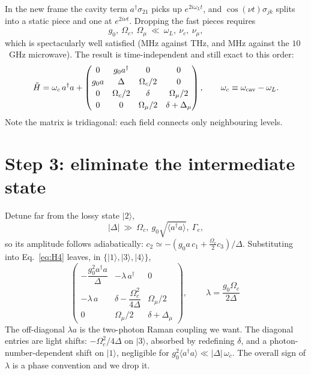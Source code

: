 \documentclass[11pt,a4paper]{article}
\newcommand{\ket}[1]{\lvert #1 \rangle}
\newcommand{\dg}{^{\dagger}}
\newcommand{\Om}{\Omega}
\newcommand{\Omu}{\Omega_{\mu}}
\newcommand{\Dmu}{\Delta_{\mu}}
\begin{document}
In the new frame the cavity term $a\dg\sigma_{21}$ picks up $e^{2i\omega_L t}$, and
$\cos(\nu t)\sigma_{jk}$ splits into a static piece and one at $e^{2i\nu t}$. Dropping the
fast pieces requires
\begin{equation}
  g_0,\ \Om_c,\ \Omu \ \ll\ \omega_L,\ \nu_c,\ \nu_\mu ,
  \tag{A1}
\end{equation}
which is spectacularly well satisfied (MHz against THz, and MHz against the $10$~GHz microwave).
The result is time-independent and still exact to this order:
\begin{equation}
  \tilde H = \omega_c\, a\dg a +
  \begin{pmatrix}
    0        & g_0 a\dg & 0        & 0 \\[2pt]
    g_0 a    & \Delta   & \Om_c/2  & 0 \\[2pt]
    0        & \Om_c/2  & \delta   & \Omu/2 \\[2pt]
    0        & 0        & \Omu/2   & \delta+\Dmu
  \end{pmatrix},
  \qquad \omega_c \equiv \omega_{\rm cav}-\omega_L .
  \label{eq:H4}
\end{equation}
Note the matrix is tridiagonal: each field connects only neighbouring levels.

\section{Step 3: eliminate the intermediate state}

Detune far from the lossy state $\ket{2}$,
\begin{equation}
  |\Delta| \ \gg\ \Om_c,\ g_0\sqrt{\langle a\dg a\rangle},\ \Gamma_e ,
  \tag{A2}
\end{equation}
so its amplitude follows adiabatically: $c_2 \simeq -(g_0 a\,c_1 + \tfrac{\Om_c}{2}c_3)/\Delta$.
Substituting into Eq.~\eqref{eq:H4} leaves, in $\{\ket{1},\ket{3},\ket{4}\}$,
\begin{equation}
  \begin{pmatrix}
    -\dfrac{g_0^2 a\dg a}{\Delta} & -\lambda\,a\dg & 0 \\[9pt]
    -\lambda\,a & \delta - \dfrac{\Om_c^2}{4\Delta} & \Omu/2 \\[9pt]
    0 & \Omu/2 & \delta+\Dmu
  \end{pmatrix},
  \qquad
  \boxed{\ \lambda = \frac{g_0\Om_c}{2\Delta}\ }
  \label{eq:H3}
\end{equation}
The off-diagonal $\lambda a$ is the two-photon Raman coupling we want. The diagonal entries are
light shifts: $-\Om_c^2/4\Delta$ on $\ket{3}$, absorbed by redefining $\delta$, and a
photon-number-dependent shift on $\ket{1}$, negligible for
$g_0^2\langle a\dg a\rangle\ll|\Delta|\,\omega_c$. The overall sign of $\lambda$ is a phase
convention and we drop it.
\end{document}
